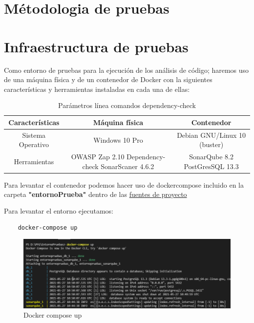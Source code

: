 \section{Métodologia de pruebas} 


\section{Infraestructura de pruebas} 
Como entorno de pruebas para la ejecución de los análisis de código; haremos uso de una máquina física y de un contenedor 
de Docker con la siguientes características y herramientas instaladas en cada una de ellas:

\begin{table}[h!]
    \begin{center}
      \caption{Parámetros línea comandos dependency-check}
      \label{tab:Infraestructura de pruebas}
      \begin{tabular}{c|c|c}
        \textbf{Características} & \textbf{Máquina física} & \textbf{Contenedor}\\
        \hline
        Sistema Operativo & Windows 10 Pro & Debian GNU/Linux 10 (buster)\\ 
        Herramientas & OWASP Zap 2.10
        Dependency-check
        SonarScaner 4.6.2
         & SonarQube 8.2
         PostGresSQL 13.3 \\ 
      \end{tabular}
    \end{center}
  \end{table}

Para levantar el contenedor podemos hacer uso de dockercompose incluido en la carpeta \textbf{"entornoPrueba"} dentro de 
las \href{https://github.com/M0l1n3ta/PFG/tree/master}{fuentes de proyecto}

Para levantar el entorno ejecutamos:

\begin{verbatim}
    docker-compose up
\end{verbatim}

\begin{figure}[h!]  
    \includegraphics[width=\linewidth]{./imagenes/04_DockerCompose_UP.png}
    \caption{Docker compose up}  
    \label{fig:19}
\end{figure}

